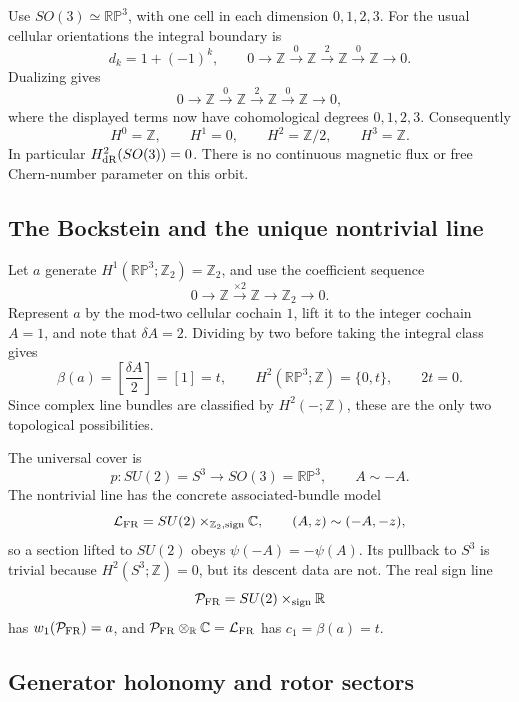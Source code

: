 \documentclass[11pt]{article}
\theoremstyle{definition}
\theoremstyle{remark}
\newcommand{\CC}{\mathbb C}
\newcommand{\RR}{\mathbb R}
\newcommand{\ZZ}{\mathbb Z}
\newcommand{\RP}{\mathbb {RP}}
\newcommand{\cL}{\mathcal L}
\newcommand{\cP}{\mathcal P}
\begin{document}
Use \(SO(3)\simeq\RP^3\), with one cell in each dimension \(0,1,2,3\).
For the usual cellular orientations the integral boundary is
\[
 d_k=1+(-1)^k,
 \qquad
 0\longrightarrow \ZZ\xrightarrow{0}\ZZ
 \xrightarrow{2}\ZZ\xrightarrow{0}\ZZ\longrightarrow0.
\]
Dualizing gives
\[
 0\longrightarrow \ZZ\xrightarrow{0}\ZZ
 \xrightarrow{2}\ZZ\xrightarrow{0}\ZZ\longrightarrow0,
\]
where the displayed terms now have cohomological degrees \(0,1,2,3\).
Consequently
\begin{equation}
 H^0=\ZZ,\qquad H^1=0,\qquad H^2=\ZZ/2,\qquad H^3=\ZZ.
 \label{eq:rp3-cohomology}
\end{equation}
In particular \(H^2_{\rm dR}(SO(3))=0\).  There is no continuous magnetic
flux or free Chern-number parameter on this orbit.

\subsection{The Bockstein and the unique nontrivial line}

Let \(a\) generate \(H^1(\RP^3;\ZZ_2)=\ZZ_2\), and use the coefficient
sequence
\[
 0\longrightarrow\ZZ\xrightarrow{\times2}\ZZ
 \longrightarrow\ZZ_2\longrightarrow0.
\]
Represent \(a\) by the mod-two cellular cochain \(1\), lift it to the integer
cochain \(A=1\), and note that \(\delta A=2\).  Dividing by two before taking
the integral class gives
\begin{equation}
 \beta(a)=\left[\frac{\delta A}{2}\right]=[1]=t,
 \qquad H^2(\RP^3;\ZZ)=\{0,t\},\qquad 2t=0.
 \label{eq:bockstein}
\end{equation}
Since complex line bundles are classified by \(H^2(-;\ZZ)\), these are the
only two topological possibilities.

The universal cover is
\[
 p:SU(2)=S^3\longrightarrow SO(3)=\RP^3,
 \qquad A\sim-A.
\]
The nontrivial line has the concrete associated-bundle model
\begin{equation}
 \cL_{\rm FR}=SU(2)\mathbin{\times}_{\ZZ_2,\mathrm{sign}}\CC,
 \qquad (A,z)\sim(-A,-z),
 \label{eq:fr-line}
\end{equation}
so a section lifted to \(SU(2)\) obeys \(\psi(-A)=-\psi(A)\).  Its pullback
to \(S^3\) is trivial because \(H^2(S^3;\ZZ)=0\), but its descent data are
not.  The real sign line
\[
 \cP_{\rm FR}=SU(2)\mathbin{\times}_{\mathrm{sign}}\RR
\]
has \(w_1(\cP_{\rm FR})=a\), and
\(\cP_{\rm FR}\otimes_{\RR}\CC=\cL_{\rm FR}\) has
\(c_1=\beta(a)=t\).

\subsection{Generator holonomy and rotor sectors}
\end{document}
